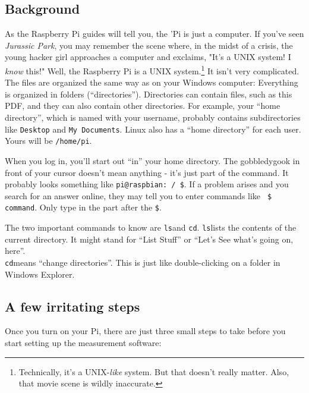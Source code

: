 \documentclass{article}
\newcommand{\ls}{\texttt{ls}}
\newcommand{\cd}{\texttt{cd}}
\begin{document}

\subsection*{Background}

As the Raspberry Pi guides will tell you, the 'Pi is just a computer.
If you've seen
\emph{Jurassic Park}, you may remember the scene where, in the midst of a crisis,
the young hacker girl approaches a computer and exclaims, "It's a UNIX system!
I \emph{know} this!" Well, the Raspberry Pi is a UNIX system.\footnote{Technically,
  it's a UNIX-\emph{like} system. But that doesn't really matter. Also, that
  movie scene is wildly inaccurate.}
It isn't very complicated. The files are organized the same way as on your
Windows computer: Everything is organized in folders (``directories''). Directories
can contain files, such as this PDF, and they can also contain other directories.
For example, your ``home directory'', which is named with your username,
probably contains subdirectories like \texttt{Desktop} and \texttt{My Documents}.
Linux also has a ``home directory'' for each user. Yours will be
\texttt{/home/pi}.

When you log in, you'll start out ``in'' your home directory.
The gobbledygook in front of your cursor doesn't mean anything - it's just
part of the command. It probably looks something like \texttt{pi@raspbian:~/ \$}.
If a problem arises and you search for an answer online, they may tell you to
enter commands like \texttt{~\$ command}. Only type in the part after the
\texttt{\$}.

The two important commands to know are \ls and \cd.
\ls lists the contents of the current directory. It might stand for ``List Stuff''
or ``Let's See what's going on, here''.\\
\cd means ``change directories''. This is just like double-clicking on a folder
in Windows Explorer.\\

\subsection*{A few irritating steps}

Once you turn on your Pi, there are just
three small steps to take before you start setting up the measurement software:
\end{document}
